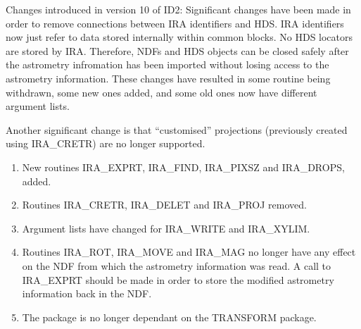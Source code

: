 Changes introduced in version 10 of ID2:
Significant changes have been made in order to remove connections between
IRA identifiers and HDS. IRA identifiers now just refer to data stored
internally within common blocks. No HDS locators are stored by IRA. Therefore,
NDFs and HDS objects can be closed safely after the astrometry infromation has
been imported without losing access to the astrometry information. These 
changes have resulted in some routine being withdrawn, some new ones added, and 
some old ones now have different argument lists. 

Another significant change is that ``customised'' projections (previously
created using IRA\_CRETR) are no longer supported. 

\begin{enumerate}
\item New routines IRA\_EXPRT, IRA\_FIND, IRA\_PIXSZ and IRA\_DROPS, added.
\item Routines IRA\_CRETR, IRA\_DELET and IRA\_PROJ removed.
\item Argument lists have changed for IRA\_WRITE and IRA\_XYLIM.
\item Routines IRA\_ROT, IRA\_MOVE and IRA\_MAG no longer have any effect on the
NDF from which the astrometry information was read. A call to IRA\_EXPRT should
be made in order to store the modified astrometry information back in the NDF. 
\item The package is no longer dependant on the TRANSFORM package.
\end{enumerate}

